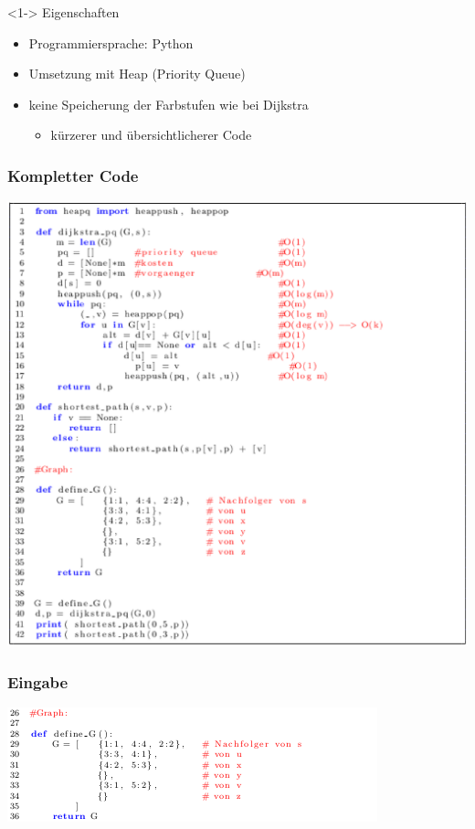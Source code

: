 \begin{frame}
	\begin{block} <1-> {Eigenschaften}
		\begin{itemize}
			\item <2-> Programmiersprache: Python
			\item <3-> Umsetzung mit Heap (Priority Queue)
			\item <4-> keine Speicherung der Farbstufen wie bei Dijkstra
				\begin{itemize}
					\item <5-> kürzerer und übersichtlicherer Code
				\end{itemize}
		\end{itemize}
	\end{block}	
\end{frame}


\begin{frame}
\frametitle{Kompletter Code}
	\centering
	\includegraphics[scale=0.3]{./pictures/dikstra_pythonCode.eps}
\end{frame}


\begin{frame}
	\frametitle{Eingabe}
	\centering
	\includegraphics[scale=0.8]{./pictures/Eingabe.png}
\end{frame}


